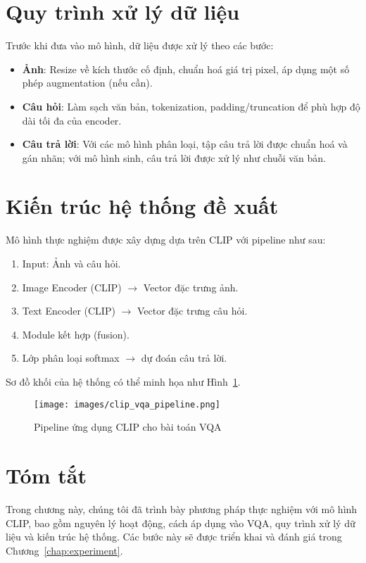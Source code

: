 \section{Quy trình xử lý dữ liệu}
Trước khi đưa vào mô hình, dữ liệu được xử lý theo các bước:  
\begin{itemize}
    \item \textbf{Ảnh}: Resize về kích thước cố định, chuẩn hoá giá trị pixel, áp dụng một số phép augmentation (nếu cần).  
    \item \textbf{Câu hỏi}: Làm sạch văn bản, tokenization, padding/truncation để phù hợp độ dài tối đa của encoder.  
    \item \textbf{Câu trả lời}: Với các mô hình phân loại, tập câu trả lời được chuẩn hoá và gán nhãn; với mô hình sinh, câu trả lời được xử lý như chuỗi văn bản.  
\end{itemize}

\section{Kiến trúc hệ thống đề xuất}
Mô hình thực nghiệm được xây dựng dựa trên CLIP với pipeline như sau:  

\begin{enumerate}
    \item Input: Ảnh và câu hỏi.  
    \item Image Encoder (CLIP) $\rightarrow$ Vector đặc trưng ảnh.  
    \item Text Encoder (CLIP) $\rightarrow$ Vector đặc trưng câu hỏi.  
    \item Module kết hợp (fusion).  
    \item Lớp phân loại softmax $\rightarrow$ dự đoán câu trả lời.  
\end{enumerate}

Sơ đồ khối của hệ thống có thể minh họa như Hình~\ref{fig:clip-vqa-pipeline}.  

\begin{figure}[H]
    \centering
    \texttt{[image: images/clip\_vqa\_pipeline.png]}
    \caption{Pipeline ứng dụng CLIP cho bài toán VQA}
    \label{fig:clip-vqa-pipeline}
\end{figure}

\section{Tóm tắt}
Trong chương này, chúng tôi đã trình bày phương pháp thực nghiệm với mô hình CLIP, bao gồm nguyên lý hoạt động, cách áp dụng vào VQA, quy trình xử lý dữ liệu và kiến trúc hệ thống. Các bước này sẽ được triển khai và đánh giá trong Chương~\ref{chap:experiment}.
